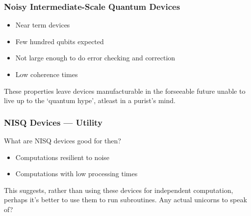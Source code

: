 
\begin{frame}
    \frametitle{Noisy Intermediate-Scale Quantum Devices}

    \begin{itemize}
        \item Near term devices
        \item Few hundred qubits expected
        \item Not large enough to do error checking and correction
        \item Low coherence times
    \end{itemize}

    These properties leave devices manufacturable in the forseeable future
    unable to live up to the `quantum hype', atleast in a purist's mind. 

\end{frame}

\begin{frame}
    \frametitle{NISQ Devices --- Utility}

    What are NISQ devices good for then?

    \begin{itemize}
        \item Computations resilient to noise
        \item Computations with low processing times
    \end{itemize}

    This suggests, rather than using these devices for independent computation,
    perhaps it's better to use them to run subroutines. 
    Any actual unicorns to speak of?

\end{frame}
